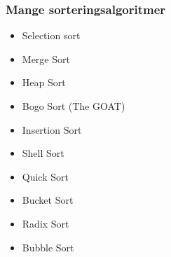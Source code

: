 \documentclass{article}
\begin{document}
    \subsubsection{Mange sorteringsalgoritmer}
    \begin{itemize}
        \item Selection sort
        \item Merge Sort
        \item Heap Sort
        \item Bogo Sort (The GOAT)
        \item Insertion Sort
        \item Shell Sort
        \item Quick Sort
        \item Bucket Sort
        \item Radix Sort
        \item Bubble Sort
    \end{itemize}
\end{document}
